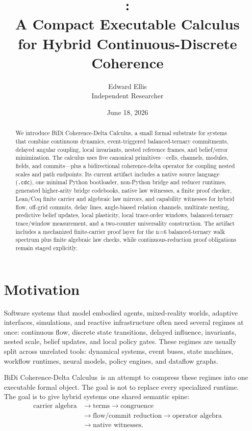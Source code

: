 \documentclass[11pt]{article}
\title{\CDC:\\A Compact Executable Calculus for Hybrid Continuous-Discrete Coherence}
\author{Edward Ellis\\Independent Researcher}
\date{June 18, 2026}
\newcommand{\CDC}{BiDi Coherence-Delta Calculus}
\begin{document}
\maketitle

\begin{abstract}
We introduce \CDC, a small formal substrate for systems that combine continuous
dynamics, event-triggered balanced-ternary commitments, delayed angular coupling, local
invariants, nested reference frames, and belief/error minimization. The calculus
uses five canonical primitives---cells, channels, modules, fields, and
commits---plus a bidirectional coherence-delta operator for coupling nested
scales and path endpoints. Its current artifact includes a native source
language (\texttt{.cdc}), one minimal Python bootloader, non-Python bridge and
reducer runtimes, generated higher-arity bridge codebooks, native law witnesses,
a finite proof checker, Lean/Coq finite carrier and algebraic law mirrors, and
capability witnesses for hybrid flow, off-grid commits, delay lines,
angle-biased relation channels, multirate nesting, predictive belief updates,
local plasticity, local trace-order windows, balanced-ternary trace/window measurement, and a two-counter
universality construction. The artifact includes a mechanized finite-carrier
proof layer for the n=6 balanced-ternary walk spectrum plus finite algebraic
law checks, while continuous-reduction proof obligations remain staged explicitly.
\end{abstract}

\section{Motivation}

Software systems that model embodied agents, mixed-reality worlds, adaptive
interfaces, simulations, and reactive infrastructure often need several regimes
at once: continuous flow, discrete state transitions, delayed influence,
invariants, nested scale, belief updates, and local policy gates. These regimes
are usually split across unrelated tools: dynamical systems, event buses, state
machines, workflow runtimes, neural models, policy engines, and dataflow graphs.

\CDC\ is an attempt to compress these regimes into one executable formal object.
The goal is not to replace every specialized runtime. The goal is to give hybrid
systems one shared semantic spine:
\[
\begin{aligned}
\text{carrier algebra} &\to \text{terms} \to \text{congruence}\\
&\to \text{flow/commit reduction} \to \text{operator algebra}\\
&\to \text{native witnesses}.
\end{aligned}
\]
\end{document}
